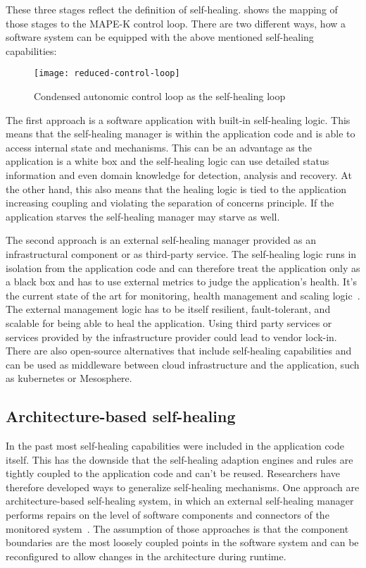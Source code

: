   These three stages reflect the definition of self-healing.
   shows the mapping of those stages to the MAPE-K control loop.
  There are two different ways, how a software system can be equipped with the above mentioned self-healing capabilities:

  \begin{figure}
    \centering
    \texttt{[image: reduced-control-loop]}
    \caption{Condensed autonomic control loop as the self-healing loop}
    \label{fig:self-healing-loop}
  \end{figure}

  The first approach is a software application with built-in self-healing logic.
  This means that the self-healing manager is within the application code and is able to access internal state and mechanisms.
  This can be an advantage as the application is a white box and the self-healing logic can use detailed status information and even domain knowledge for detection, analysis and recovery.
  At the other hand, this also means that the healing logic is tied to the application increasing coupling and violating the separation of concerns principle.
  If the application starves the self-healing manager may starve as well.

  The second approach is an external self-healing manager provided as an infrastructural component or as third-party service.
  The self-healing logic runs in isolation from the application code and can therefore treat the application only as a black box and has to use external metrics to judge the application's health.
  It's the current state of the art for monitoring, health management and scaling logic~\cite{ToffettiMicroservices}.
  The external management logic has to be itself resilient, fault-tolerant, and scalable for being able to heal the application.
  Using third party services or services provided by the infrastructure provider could lead to vendor lock-in.
  There are also open-source alternatives that include self-healing capabilities and can be used as middleware between cloud infrastructure and the application, such as \gls{kubernetes} or Mesosphere.

\subsection{Architecture-based self-healing}
  In the past most self-healing capabilities were included in the application code itself.
  This has the downside that the self-healing adaption engines and rules are tightly coupled to the application code and can't be reused.
  Researchers have therefore developed ways to generalize self-healing mechanisms.
  One approach are architecture-based self-healing system, in which an external self-healing manager performs repairs on the level of software components and connectors of the monitored system~\cite{DashofyArchitecture}.
  The assumption of those approaches is that the component boundaries are the most loosely coupled points in the software system and can be reconfigured to allow changes in the architecture during runtime.

